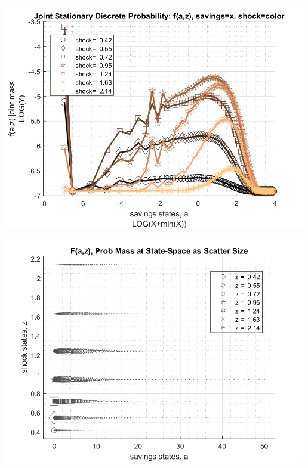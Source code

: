 \documentclass[
]{book}
\begin{document}
\includegraphics[width=5.20833in,height=\textheight]{img/fx_ds_az_cts_vec_images/figure_5.png}

\includegraphics[width=5.20833in,height=\textheight]{img/fx_ds_az_cts_vec_images/figure_6.png}
\end{document}

